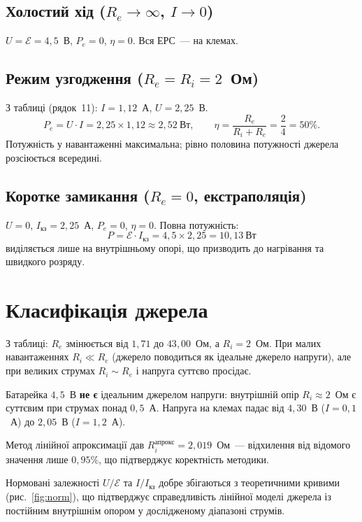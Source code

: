 \documentclass{LabWork}
\begin{document}
\subsection*{Холостий хід ($R_e \to \infty$, $I \to 0$)}
$U = \mathcal{E} = 4{,}5$~В, $P_e = 0$, $\eta = 0$. Вся ЕРС~--- на клемах.

\subsection*{Режим узгодження ($R_e = R_i = 2$~Ом)}
З таблиці (рядок~11): $I = 1{,}12$~А, $U = 2{,}25$~В.
\[
    P_e = U \cdot I = 2{,}25 \times 1{,}12 \approx 2{,}52~\text{Вт},
    \qquad \eta = \frac{R_e}{R_i + R_e} = \frac{2}{4} = 50\%.
\]
Потужність у навантаженні максимальна; рівно половина потужності джерела розсіюється всередині.

\subsection*{Коротке замикання ($R_e = 0$, екстраполяція)}
$U = 0$, $I_\text{кз} = 2{,}25$~А, $P_e = 0$, $\eta = 0$. Повна потужність:
\[
    P = \mathcal{E} \cdot I_\text{кз} = 4{,}5 \times 2{,}25 = 10{,}13~\text{Вт}
\]
виділяється лише на внутрішньому опорі, що призводить до нагрівання та швидкого розряду.

\section{Класифікація джерела}

З таблиці: $R_e$ змінюється від $1{,}71$ до $43{,}00$~Ом, а $R_i = 2$~Ом. При малих навантаженнях $R_i \ll R_e$ (джерело поводиться як ідеальне джерело напруги), але при великих струмах $R_i \sim R_e$ і напруга суттєво просідає.

Батарейка $4{,}5$~В \textbf{не є} ідеальним джерелом напруги: внутрішній опір $R_i \approx 2$~Ом є суттєвим при струмах понад $0{,}5$~А. Напруга на клемах падає від $4{,}30$~В ($I=0{,}1$~А) до $2{,}05$~В ($I=1{,}2$~А).

Метод лінійної апроксимації дав $R_i^\text{апрокс} = 2{,}019$~Ом~--- відхилення від відомого значення лише $0{,}95\%$, що підтверджує коректність методики.

Нормовані залежності $U/\mathcal{E}$ та $I/I_\text{кз}$ добре збігаються з теоретичними кривими (рис.~\ref{fig:norm}), що підтверджує справедливість лінійної моделі джерела із постійним внутрішнім опором у дослідженому діапазоні струмів.
\end{document}
